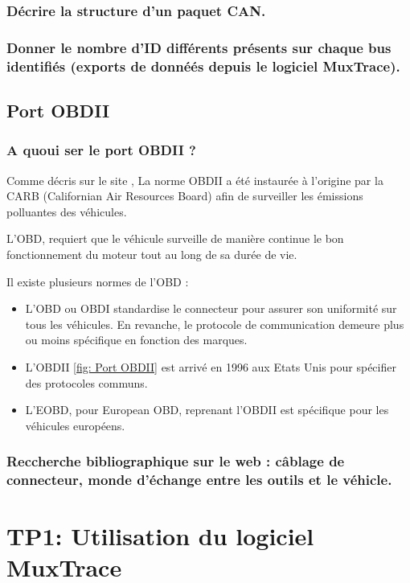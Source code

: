 \documentclass{rapportECC}
\begin{document}
\subsubsection*{Décrire la structure d'un paquet CAN.}

\subsubsection*{Donner le nombre d'ID différents présents sur chaque bus identifiés (exports de donnéés depuis le logiciel MuxTrace).}

\subsection{Port OBDII}

\subsubsection*{A quoui ser le port OBDII ?}

Comme décris sur le site \cite{klavkarr}, La norme OBDII a été instaurée à l'origine par la CARB (Californian Air Resources Board) afin de surveiller les émissions polluantes des véhicules.  

L'OBD, requiert que le véhicule surveille de manière continue le bon fonctionnement du moteur tout au long de sa durée de vie.

Il existe plusieurs normes de l'OBD : 
\begin{itemize}
    \item L'OBD ou OBDI standardise le connecteur pour assurer son uniformité sur tous les véhicules. En revanche, le protocole de communication demeure plus ou moins spécifique en fonction des marques.
    \item L'OBDII \ref{fig: Port OBDII} est arrivé en 1996 aux Etats Unis pour spécifier des protocoles communs.
    \item L'EOBD, pour European OBD, reprenant l'OBDII est spécifique pour les véhicules européens.
\end{itemize}
    
\subsubsection*{Reccherche bibliographique sur le web : câblage de connecteur, monde d'échange entre les outils et le véhicle.}

\section{TP1: Utilisation du logiciel MuxTrace}
\end{document}
